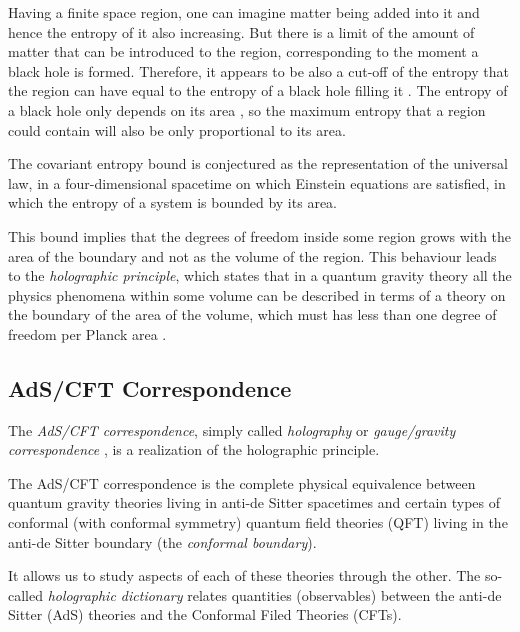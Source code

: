 \documentclass[twocolumn]{revtex4}
\begin{document}
Having a finite space region, one can imagine matter being added into it and hence the entropy of it also increasing. But there is a limit of the amount of matter that can be introduced to the region, corresponding to the moment a black hole is formed. Therefore, it appears to be also a cut-off of the entropy that the region can have equal to the entropy of a black hole filling it \cite{t_hooft_dimensional_2009}. The entropy of a black hole only depends on its area \cite{bekenstein_black_1973}, so the maximum entropy that a region could contain will also be only proportional to its area.

The covariant entropy bound \cite{bousso_covariant_1999} is conjectured as the representation of the universal law, in a four-dimensional spacetime on which Einstein equations are satisfied, in which the entropy of a system is bounded by its area.

This bound implies that the degrees of freedom inside some region grows with the area of the boundary and not as the volume of the region. This behaviour leads to the \textit{holographic principle}, which states that in a quantum gravity theory all the physics phenomena within some volume can be described in terms of a theory on the boundary of the area of the volume, which must has less than one degree of freedom per Planck area \cite{t_hooft_dimensional_2009}.


\subsection{AdS/CFT Correspondence} \label{ss:AdS/CFT}

The \textit{AdS/CFT correspondence}, simply called \textit{holography} or \textit{gauge/gravity correspondence} \cite{ramallo_introduction_2013}, is a realization of the holographic principle.

The AdS/CFT correspondence is the complete physical equivalence between quantum gravity theories living in anti-de Sitter spacetimes and certain types of conformal (with conformal symmetry) quantum field theories (QFT) living in the anti-de Sitter boundary (the \textit{conformal boundary}).

It allows us to study aspects of each of these theories through the other. The so-called \textit{holographic dictionary} relates quantities (observables) between the anti-de Sitter (AdS) theories and the Conformal Filed Theories (CFTs). %
\end{document}
